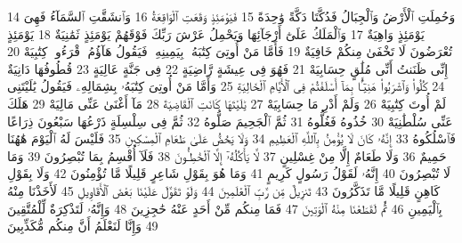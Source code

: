 {\tiny\colorbox{cl_aya}{14}} وَحُمِلَتِ ٱلْأَرْضُ وَٱلْجِبَالُ فَدُكَّتَا دَكَّةً وَٰحِدَةً
{\tiny\colorbox{cl_aya}{15}} فَيَوْمَئِذٍ وَقَعَتِ ٱلْوَاقِعَةُ
{\tiny\colorbox{cl_aya}{16}} وَٱنشَقَّتِ ٱلسَّمَآءُ فَهِىَ يَوْمَئِذٍ وَاهِيَةٌ
{\tiny\colorbox{cl_aya}{17}} وَٱلْمَلَكُ عَلَىٰٓ أَرْجَآئِهَا وَيَحْمِلُ عَرْشَ رَبِّكَ فَوْقَهُمْ يَوْمَئِذٍ ثَمَٰنِيَةٌ
{\tiny\colorbox{cl_aya}{18}} يَوْمَئِذٍ تُعْرَضُونَ لَا تَخْفَىٰ مِنكُمْ خَافِيَةٌ
{\tiny\colorbox{cl_aya}{19}} فَأَمَّا مَنْ أُوتِىَ كِتَٰبَهُۥ بِيَمِينِهِۦ فَيَقُولُ هَآؤُمُ ٱقْرَءُوا۟ كِتَٰبِيَهْ
{\tiny\colorbox{cl_aya}{20}} إِنِّى ظَنَنتُ أَنِّى مُلَٰقٍ حِسَابِيَهْ
{\tiny\colorbox{cl_aya}{21}} فَهُوَ فِى عِيشَةٍ رَّاضِيَةٍ
{\tiny\colorbox{cl_aya}{22}} فِى جَنَّةٍ عَالِيَةٍ
{\tiny\colorbox{cl_aya}{23}} قُطُوفُهَا دَانِيَةٌ
{\tiny\colorbox{cl_aya}{24}} كُلُوا۟ وَٱشْرَبُوا۟ هَنِيٓـًٔۢا بِمَآ أَسْلَفْتُمْ فِى ٱلْأَيَّامِ ٱلْخَالِيَةِ
{\tiny\colorbox{cl_aya}{25}} وَأَمَّا مَنْ أُوتِىَ كِتَٰبَهُۥ بِشِمَالِهِۦ فَيَقُولُ يَٰلَيْتَنِى لَمْ أُوتَ كِتَٰبِيَهْ
{\tiny\colorbox{cl_aya}{26}} وَلَمْ أَدْرِ مَا حِسَابِيَهْ
{\tiny\colorbox{cl_aya}{27}} يَٰلَيْتَهَا كَانَتِ ٱلْقَاضِيَةَ
{\tiny\colorbox{cl_aya}{28}} مَآ أَغْنَىٰ عَنِّى مَالِيَهْ
{\tiny\colorbox{cl_aya}{29}} هَلَكَ عَنِّى سُلْطَٰنِيَهْ
{\tiny\colorbox{cl_aya}{30}} خُذُوهُ فَغُلُّوهُ
{\tiny\colorbox{cl_aya}{31}} ثُمَّ ٱلْجَحِيمَ صَلُّوهُ
{\tiny\colorbox{cl_aya}{32}} ثُمَّ فِى سِلْسِلَةٍ ذَرْعُهَا سَبْعُونَ ذِرَاعًا فَٱسْلُكُوهُ
{\tiny\colorbox{cl_aya}{33}} إِنَّهُۥ كَانَ لَا يُؤْمِنُ بِٱللَّهِ ٱلْعَظِيمِ
{\tiny\colorbox{cl_aya}{34}} وَلَا يَحُضُّ عَلَىٰ طَعَامِ ٱلْمِسْكِينِ
{\tiny\colorbox{cl_aya}{35}} فَلَيْسَ لَهُ ٱلْيَوْمَ هَٰهُنَا حَمِيمٌ
{\tiny\colorbox{cl_aya}{36}} وَلَا طَعَامٌ إِلَّا مِنْ غِسْلِينٍ
{\tiny\colorbox{cl_aya}{37}} لَّا يَأْكُلُهُۥٓ إِلَّا ٱلْخَٰطِـُٔونَ
{\tiny\colorbox{cl_aya}{38}} فَلَآ أُقْسِمُ بِمَا تُبْصِرُونَ
{\tiny\colorbox{cl_aya}{39}} وَمَا لَا تُبْصِرُونَ
{\tiny\colorbox{cl_aya}{40}} إِنَّهُۥ لَقَوْلُ رَسُولٍ كَرِيمٍ
{\tiny\colorbox{cl_aya}{41}} وَمَا هُوَ بِقَوْلِ شَاعِرٍ قَلِيلًا مَّا تُؤْمِنُونَ
{\tiny\colorbox{cl_aya}{42}} وَلَا بِقَوْلِ كَاهِنٍ قَلِيلًا مَّا تَذَكَّرُونَ
{\tiny\colorbox{cl_aya}{43}} تَنزِيلٌ مِّن رَّبِّ ٱلْعَٰلَمِينَ
{\tiny\colorbox{cl_aya}{44}} وَلَوْ تَقَوَّلَ عَلَيْنَا بَعْضَ ٱلْأَقَاوِيلِ
{\tiny\colorbox{cl_aya}{45}} لَأَخَذْنَا مِنْهُ بِٱلْيَمِينِ
{\tiny\colorbox{cl_aya}{46}} ثُمَّ لَقَطَعْنَا مِنْهُ ٱلْوَتِينَ
{\tiny\colorbox{cl_aya}{47}} فَمَا مِنكُم مِّنْ أَحَدٍ عَنْهُ حَٰجِزِينَ
{\tiny\colorbox{cl_aya}{48}} وَإِنَّهُۥ لَتَذْكِرَةٌ لِّلْمُتَّقِينَ
{\tiny\colorbox{cl_aya}{49}} وَإِنَّا لَنَعْلَمُ أَنَّ مِنكُم مُّكَذِّبِينَ
